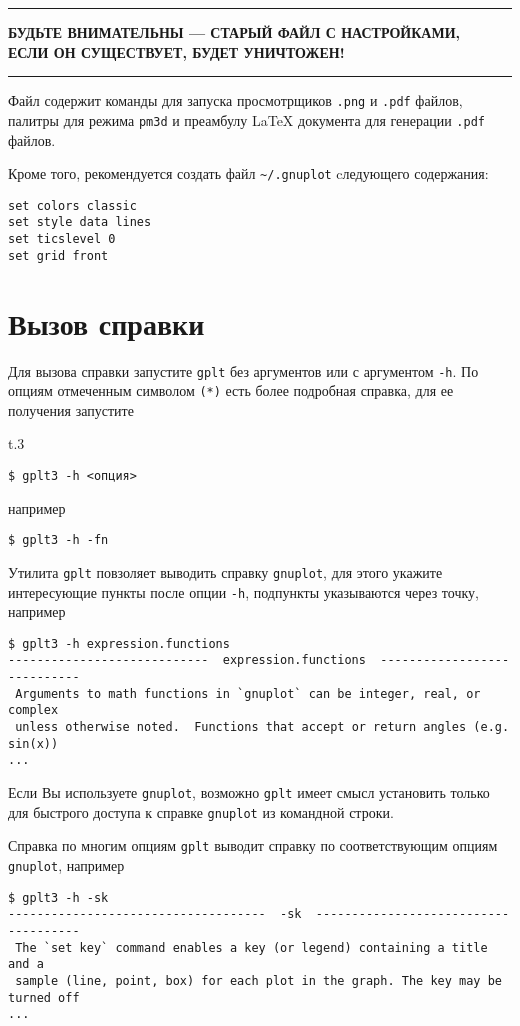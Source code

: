 \documentclass[12pt]{article}
\def\gplt{{\tt gplt}}
\def\gnuplot{{\tt gnuplot}}
\def\png{{\tt .png}}
\def\pdf{{\tt .pdf}}
\begin{document}
\hrule
\begin{center}
\bf БУДЬТЕ ВНИМАТЕЛЬНЫ --- СТАРЫЙ ФАЙЛ С НАСТРОЙКАМИ,\\
ЕСЛИ ОН СУЩЕСТВУЕТ, БУДЕТ УНИЧТОЖЕН!
  \end{center}
\hrule
\phantom{.}

Файл содержит команды для запуска просмотрщиков \png{} и \pdf{} файлов, палитры для режима \verb'pm3d' и преамбулу \LaTeX{} документа для генерации \pdf{} файлов.

Кроме того, рекомендуется создать файл \verb'~/.gnuplot' cледующего содержания:
\begin{verbatim}
set colors classic
set style data lines
set ticslevel 0
set grid front
\end{verbatim}

\section{Вызов справки}
Для вызова справки запустите \gplt{} без аргументов или с аргументом \verb'-h'. По  опциям отмеченным символом \verb'(*)'
есть более подробная справка, для ее получения запустите
\begin{wrapfigure}[3]{t}{.3\textwidth}
\end{wrapfigure}
\begin{verbatim}
$ gplt3 -h <опция>
\end{verbatim}
например
\begin{verbatim}
$ gplt3 -h -fn
\end{verbatim}

Утилита \gplt{} повзоляет выводить справку \gnuplot, для этого укажите интересующие пункты после опции \verb'-h',
подпункты указываются через точку, например
\begin{verbatim}
$ gplt3 -h expression.functions
----------------------------  expression.functions  ----------------------------
 Arguments to math functions in `gnuplot` can be integer, real, or complex
 unless otherwise noted.  Functions that accept or return angles (e.g. sin(x))
...
\end{verbatim}
Если Вы используете \gnuplot, возможно \gplt{} имеет смысл установить только для быстрого доступа к справке \gnuplot{} из командной строки.

Справка по многим опциям \gplt{} выводит справку по соответствующим опциям \gnuplot, например
\begin{verbatim}
$ gplt3 -h -sk
------------------------------------  -sk  -------------------------------------
 The `set key` command enables a key (or legend) containing a title and a
 sample (line, point, box) for each plot in the graph. The key may be turned off
...
\end{verbatim}
\end{document}
